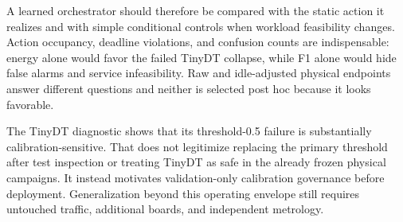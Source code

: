 A learned orchestrator should therefore be compared with the static action it realizes and with simple conditional controls when workload feasibility changes. Action occupancy, deadline violations, and confusion counts are indispensable: energy alone would favor the failed TinyDT collapse, while F1 alone would hide false alarms and service infeasibility. Raw and idle-adjusted physical endpoints answer different questions and neither is selected post hoc because it looks favorable.

The TinyDT diagnostic shows that its threshold-0.5 failure is substantially calibration-sensitive. That does not legitimize replacing the primary threshold after test inspection or treating TinyDT as safe in the already frozen physical campaigns. It instead motivates validation-only calibration governance before deployment. Generalization beyond this operating envelope still requires untouched traffic, additional boards, and independent metrology.
